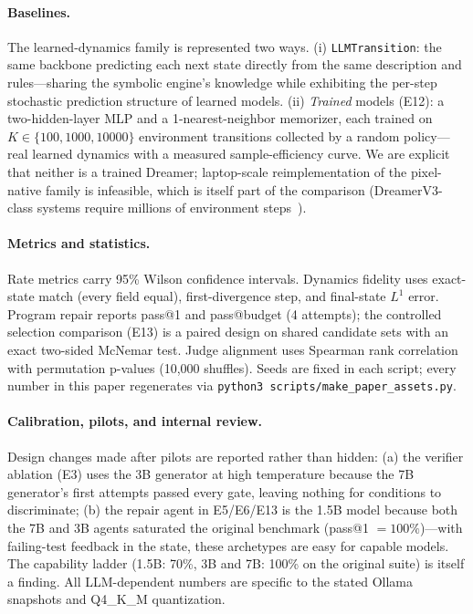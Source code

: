 \documentclass[11pt]{article}
\begin{document}
\paragraph{Baselines.} The learned-dynamics family is represented two ways.
(i) \texttt{LLMTransition}: the same backbone predicting each next state
directly from the same description and rules---sharing the symbolic engine's
knowledge while exhibiting the per-step stochastic prediction structure of
learned models. (ii) \emph{Trained} models (E12): a two-hidden-layer
MLP and a 1-nearest-neighbor memorizer, each trained on $K \in \{100, 1000,
10000\}$ environment transitions collected by a random policy---real learned
dynamics with a measured sample-efficiency curve. We are explicit that
neither is a trained Dreamer; laptop-scale reimplementation of the
pixel-native family is infeasible, which is itself part of the comparison
(DreamerV3-class systems require millions of environment
steps~\cite{dreamerv3}).

\paragraph{Metrics and statistics.} Rate metrics carry 95\% Wilson confidence
intervals. Dynamics fidelity uses exact-state match (every field equal),
first-divergence step, and final-state $L^1$ error. Program repair reports
pass@1 and pass@budget (4 attempts); the controlled selection comparison
(E13) is a paired design on shared candidate sets with an exact two-sided
McNemar test. Judge alignment uses Spearman rank correlation with permutation
p-values (10{,}000 shuffles). Seeds are fixed in each script; every number in
this paper regenerates via \texttt{python3 scripts/make\_paper\_assets.py}.

\paragraph{Calibration, pilots, and internal review.} Design changes made
after pilots are reported rather than hidden: (a) the verifier ablation (E3)
uses the 3B generator at high temperature because the 7B generator's first
attempts passed every gate, leaving nothing for conditions to discriminate;
(b) the repair agent in E5/E6/E13 is the 1.5B model because both the 7B and
3B agents saturated the original benchmark (pass@1 $=100\%$)---with
failing-test feedback in the state, these archetypes are easy for capable
models. The capability ladder (1.5B: 70\%, 3B and 7B: 100\% on the original
suite) is itself a finding. All LLM-dependent numbers are
specific to the stated Ollama snapshots and Q4\_K\_M quantization.
\end{document}
